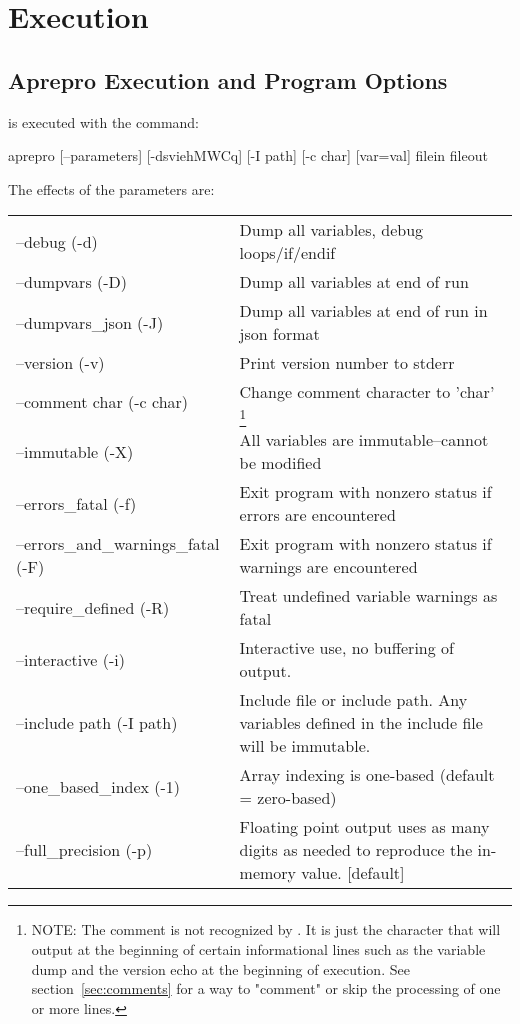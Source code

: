 \chapter{Execution}\label{ch:execution}

\section{Aprepro Execution and Program Options}
\aprepro{} is executed with the command:
\begin{apinp}
aprepro [--parameters] [-dsviehMWCq] [-I path] [-c char] [var=val] filein fileout
\end{apinp}

The effects of the parameters are:
\begin{longtable}{lp{5.0in}}
--debug (-d) &  Dump all variables, debug loops/if/endif \\
--dumpvars (-D) & Dump all variables at end of run \\
--dumpvars\_json (-J) & Dump all variables at end of run in json format \\
--version (-v) &  Print version number to stderr           \\
--comment char (-c char) &  Change comment character to 'char' \footnote{NOTE: The comment is not recognized by \aprepro{}. It is just the character that \aprepro{} will output at the beginning of certain informational lines such as the variable dump and the version echo at the beginning of execution.   See section~\ref{sec:comments} for a way to "comment" or skip the processing of one or more lines.}   \\
--immutable (-X) &  All variables are immutable--cannot be modified \\
--errors\_fatal (-f) & Exit program with nonzero status if errors are encountered \\
--errors\_and\_warnings\_fatal (-F) & Exit program with nonzero status if warnings are encountered \\
--require\_defined (-R) & Treat undefined variable warnings as fatal \\
--interactive (-i) &  Interactive use, no buffering of output.       \\
--include path (-I path) &  Include file or include path. Any variables defined in the include file will be immutable.\\
--one\_based\_index (-1) & Array indexing is one-based (default = zero-based) \\
--full\_precision (-p) &  Floating point output uses as many digits as needed to reproduce the in-memory value. [default] \\

\end{longtable}
